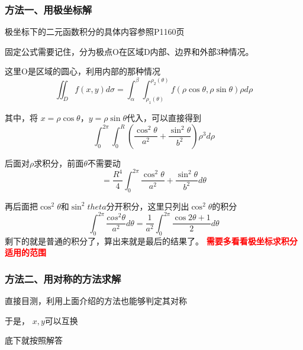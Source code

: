 \documentclass[a4paper]{ctexart}
\begin{document}
\begin{multicols}{2}
\subsubsection{方法一、用极坐标解}
\par 极坐标下的二元函数积分的具体内容参照P1160页
\par 固定公式需要记住，分为极点O在区域D内部、边界和外部3种情况。
\par 这里O是区域的圆心，利用内部的那种情况
\begin{equation}
\iint_{D}{f(x,y)d\sigma} = \int_{\alpha}^{\beta}\int_{\rho_1(\theta)}^{\rho_2(\theta)}{f(\rho\cos{\theta},\rho\sin{\theta})\rho d\rho }
\end{equation}
\par 其中，将 $x=\rho \cos{\theta}$，$y=\rho \sin{\theta}$代入，可以直接得到
\begin{equation}
\int_{0}^{2\pi}\int_{0}^R{
    (
        \frac{\cos^2{\theta}}{a^2}
        +
        \frac{\sin^2{\theta}}{b^2}
    )
    \rho^3d\rho
}
\end{equation}
\par 后面对$\rho$求积分，前面$\theta$不需要动
\begin{equation}
= \frac{R^4}{4}
\int_0^{2\pi}
{
    \frac{\cos^2{\theta}}{a^2}
    +
    \frac{\sin^2{\theta}}{b^2}
    d\theta
}
\end{equation}
\par 再后面把$\cos^2{\theta}$和$\sin^2{theta}$分开积分，这里只列出$\cos^2{\theta}$的积分
\begin{equation}
\int_0^{2\pi}
{
    \frac{cos^2{\theta}}{a^2} d \theta
}
=
\frac{1}{a^2}
\int_0^{2\pi}
{
    \frac{\cos{2\theta} + 1}{2} d\theta
}
\end{equation}
剩下的就是普通的积分了，算出来就是最后的结果了。
\textbf{\textcolor{red}{需要多看看极坐标求积分适用的范围}}

\subsubsection{方法二、用对称的方法求解}
\par 直接目测，利用上面介绍的方法也能够判定其对称
\par 于是， $x,y$可以互换
\par 底下就按照解答


\end{multicols}
\end{document}
